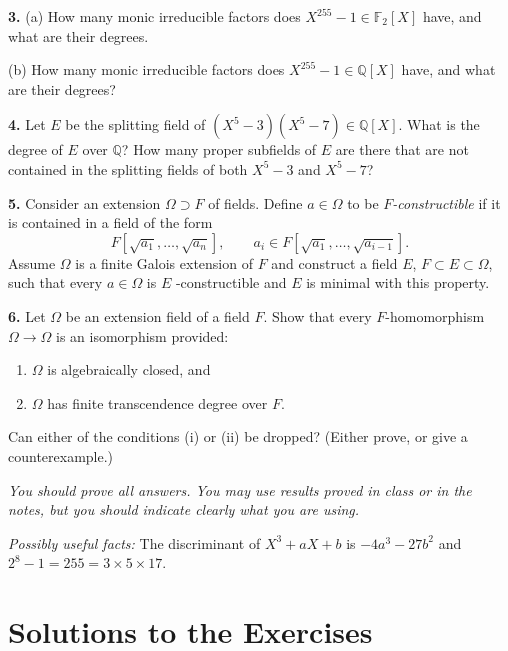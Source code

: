\documentclass[a4paper,11pt,final,openany]{memoir}
\theoremstyle{nonumberplain}
\begin{document}
\medskip\noindent\textbf{3.} (a) How many monic irreducible factors does
$X^{255}-1\in\mathbb{F}_{2}[X]$ have, and what are their degrees.

\noindent(b) How many monic irreducible factors does $X^{255}-1\in{\mathbb{Q}%
}[X]$ have, and what are their degrees?

\medskip\noindent\textbf{4.} Let $E$ be the splitting field of $(X^{5}%
-3)(X^{5}- 7)\in{\mathbb{Q}}[X]$. What is the degree of $E$ over ${\mathbb{Q}%
}$? How many proper subfields of $E$ are there that are not contained in the
splitting fields of both $X^{5}-3$ and $X^{5}-7$?


\medskip\noindent\textbf{5.} Consider an extension $\Omega\supset F$ of
fields. Define $a\in\Omega$ to be $F$\textit{-constructible\/} if it is
contained in a field of the form
\[
F[\sqrt{a_{1}},\ldots,\sqrt{a_{n}}],\qquad a_{i}\in F[\sqrt{a_{1}}%
,\ldots,\sqrt{a_{i-1}}].
\]
Assume $\Omega$ is a finite Galois extension of $F$ and construct a field $E
$, $F\subset E\subset\Omega$, such that every $a\in\Omega$ is $E$%
-constructible and $E$ is minimal with this property.

\medskip\noindent\textbf{6.} Let $\Omega$ be an extension field of a field $F
$. Show that every $F$-homomorphism $\Omega\to\Omega$ is an isomorphism provided:

\begin{enumerate}
\item $\Omega$ is algebraically closed, and

\item $\Omega$ has finite transcendence degree over $F$.
\end{enumerate}

Can either of the conditions (i) or (ii) be dropped? (Either prove, or give a counterexample.)

\medskip\noindent\textit{You should prove all answers. You may use results
proved in class or in the notes, but you should indicate clearly what you are
using. }

\medskip\noindent\textit{Possibly useful facts:\/} The discriminant of
$X^{3}+aX+b$ is $-4a^{3}-27b^{2}$ and $2^{8}-1=255=3\times5\times17$.

\clearpage


\chapter{Solutions to the Exercises}
\end{document}
